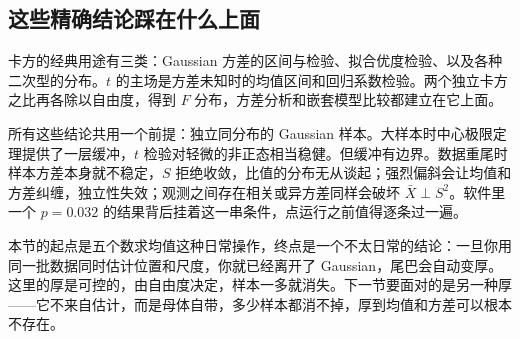 \subsection{这些精确结论踩在什么上面}

卡方的经典用途有三类：Gaussian 方差的区间与检验、拟合优度检验、以及各种二次型的分布。\(t\) 的主场是方差未知时的均值区间和回归系数检验。两个独立卡方之比再各除以自由度，得到 \(F\) 分布，方差分析和嵌套模型比较都建立在它上面。

所有这些结论共用一个前提：独立同分布的 Gaussian 样本。大样本时中心极限定理提供了一层缓冲，\(t\) 检验对轻微的非正态相当稳健。但缓冲有边界。数据重尾时样本方差本身就不稳定，\(S\) 拒绝收敛，比值的分布无从谈起；强烈偏斜会让均值和方差纠缠，独立性失效；观测之间存在相关或异方差同样会破坏 \(\bar X\perp S^2\)。软件里一个 \(p=0.032\) 的结果背后挂着这一串条件，点运行之前值得逐条过一遍。

本节的起点是五个数求均值这种日常操作，终点是一个不太日常的结论：一旦你用同一批数据同时估计位置和尺度，你就已经离开了 Gaussian，尾巴会自动变厚。这里的厚是可控的，由自由度决定，样本一多就消失。下一节要面对的是另一种厚——它不来自估计，而是母体自带，多少样本都消不掉，厚到均值和方差可以根本不存在。
